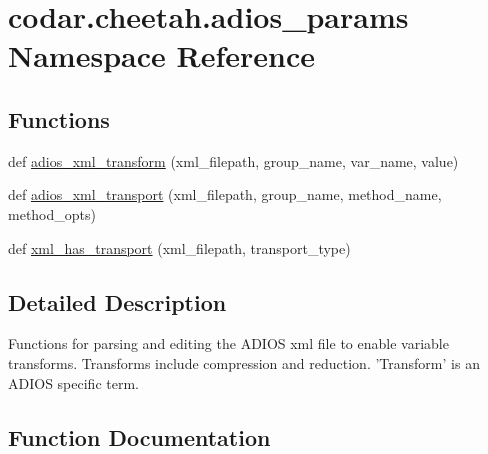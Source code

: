 \hypertarget{namespacecodar_1_1cheetah_1_1adios__params}{}\section{codar.\+cheetah.\+adios\+\_\+params Namespace Reference}
\label{namespacecodar_1_1cheetah_1_1adios__params}
\subsection*{Functions}
\begin{DoxyCompactItemize}
\item 
def \hyperlink{namespacecodar_1_1cheetah_1_1adios__params_af6d6387529764fc1a3d89a2b2709899d}{adios\+\_\+xml\+\_\+transform} (xml\+\_\+filepath, group\+\_\+name, var\+\_\+name, value)
\item 
def \hyperlink{namespacecodar_1_1cheetah_1_1adios__params_a864ce8fd49004c56565ebcc18c26f2a7}{adios\+\_\+xml\+\_\+transport} (xml\+\_\+filepath, group\+\_\+name, method\+\_\+name, method\+\_\+opts)
\item 
def \hyperlink{namespacecodar_1_1cheetah_1_1adios__params_a9dff010d44b62d23336c76d11ed2c7e3}{xml\+\_\+has\+\_\+transport} (xml\+\_\+filepath, transport\+\_\+type)
\end{DoxyCompactItemize}


\subsection{Detailed Description}
\begin{DoxyVerb}Functions for parsing and editing the ADIOS xml file to enable variable
transforms.  Transforms include compression and reduction. 'Transform'
is an ADIOS specific term.
\end{DoxyVerb}
 

\subsection{Function Documentation}
\mbox{\label{namespacecodar_1_1cheetah_1_1adios__params_af6d6387529764fc1a3d89a2b2709899d}} 
